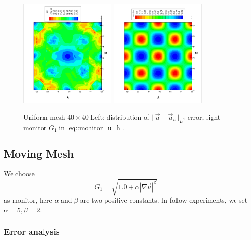 \documentclass{article}
\begin{document}
 \begin{figure}[ht]
   \centering
   \includegraphics[width = 0.43\textwidth, angle = -90]{./uniform40_error.eps}
   \includegraphics[width = 0.43\textwidth, angle = -90]{./uniform40_monitor.eps}
   \caption{\small Uniform mesh $40 \times 40$ Left: distribution of
     $||\vec{u} - \vec{u}_h||_{L^2}$ error, right: monitor $G_1$ in \ref{eq::monitor_u_h}.}
   \label{fig::uniform40_error_monitor}
 \end{figure}


\subsection{Moving Mesh}
  We choose 
  \begin{equation}
    G_1 = \sqrt{1.0 + \alpha {|\nabla \vec{u}|}^{\beta}}
    \label{eq::monitor_u_h}
  \end{equation}
  as monitor, here $\alpha$ and $\beta$ are two positive constants.
  In follow experiments, we set $\alpha = 5, \beta = 2$.

  \subsubsection{Error analysis}
  
\end{document}
